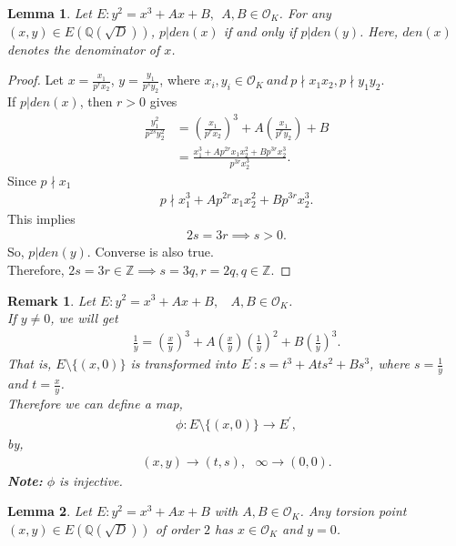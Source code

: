 \documentclass[12pt,leqno]{amsart}
\newcommand{\<}{\langle}
\renewcommand{\>}{\rangle}
\newtheorem{lemma}{Lemma}
\newtheorem{rmk}{Remark}
\theoremstyle{definition}
\numberwithin{equation}{section}
\begin{document}
 \begin{lemma}\label{lemma1}
 Let $E:y^2=x^3+Ax+B,~~ A,B\in{\mathcal{O}_K}$. For any $(x,y)\in E(\mathbb Q(\sqrt{D}))$, $p\vert den(x)$ if and only if $p\vert den(y)$. Here, $den(x)$ denotes the denominator of $x$.   
 \end{lemma}
 \begin{proof}
     Let $x=\frac{x_1}{p^rx_2}$, $y=\frac{y_1}{p^sy_2}$, where $x_i,y_i\in{\mathcal{O}_K}~and~p\nmid x_1x_2, p\nmid y_1y_2$.\\
     If $p\vert den(x)$, then $r>0$ gives
     \begin{align*}
         \frac{y_1^2}{p^{2s}y_2^2}&=\left(\frac{x_1}{p^rx_2}\right)^3+A\left(\frac{x_1}{p^r y_2}\right)+B\\
         &=\frac{x_1^3+Ap^{2r}x_1x_2^2+Bp^{3r}x_2^3}{p^{3r}x_2^3}.
     \end{align*}
    Since $p\nmid x_1$ \\
     \begin{align*}
         p\nmid x_1^3+Ap^{2r}x_1x_2^2+Bp^{3r}x_2^3.
     \end{align*}
    This implies
    \begin{align*}
        2s=3r \implies s>0.
    \end{align*}
    So, $p\vert den(y) $. Converse is also true.\\
    Therefore, $2s=3r\in\mathbb Z\implies s=3q,r=2q,q\in \mathbb Z$.
 \end{proof}
 \begin{rmk}
Let $E:y^2=x^3+Ax+B,~~~~A,B\in{\mathcal{O}_K}$.\\
If $y\neq 0$, we will get\\
\begin{align*}
    \frac{1}{y}=\left(\frac{x}{y}\right)^3+A\left(\frac{x}{y}\right)\left(\frac{1}{y}\right)^2+B\left(\frac{1}{y}\right)^3.
\end{align*}
That is, $E\setminus \{(x,0)\}$ is transformed into $E^{'}:s=t^3+Ats^2+Bs^3$, where $s=\frac{1}{y}$ and $t=\frac{x}{y}$.\\
Therefore we can define a map, \begin{align*}
    \phi:E\setminus \{(x,0)\}\longrightarrow E^{'},
\end{align*} 
by,
\begin{align*}
    (x,y)\longrightarrow(t,s),~~~\infty \longrightarrow(0,0).
\end{align*}
\textbf{Note:} $\phi$ is injective.
 \end{rmk}
 \begin{lemma}\label{lemma2}
     Let $E:y^2=x^3+Ax+B$ with $A,B\in {\mathcal{O}_K}$. Any torsion point $(x,y)\in E(\mathbb Q(\sqrt{D}))$ of order $2$ has $x\in{\mathcal{O}_K}$ and $y=0$.
\end{lemma}
\end{document}
